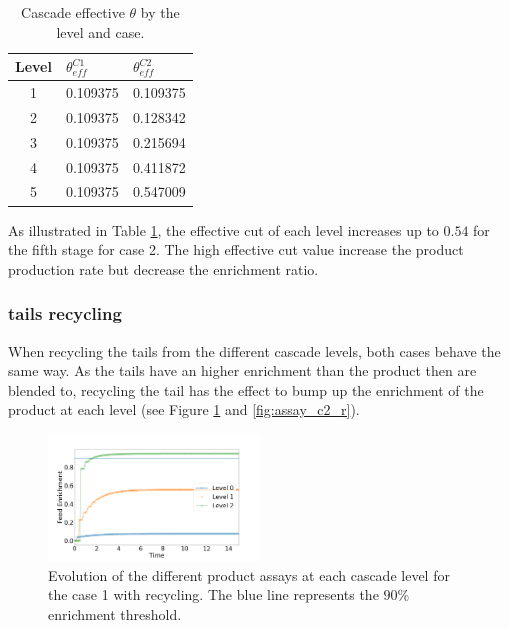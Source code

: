 \documentclass{anstrans}
\begin{document}
\begin{table}[htb]
\centering
\begin{tabular}{cll}
\toprule

Level   &  $\theta_{eff}^{C1}$   & $\theta_{eff}^{C2}$ \\
\midrule
1       & 0.109375               & 0.109375     \\
2       & 0.109375               & 0.128342     \\
3       & 0.109375               & 0.215694     \\
4       & 0.109375               & 0.411872     \\
5       & 0.109375               & 0.547009     \\

\bottomrule
\end{tabular}
  \caption{Cascade effective $\theta$ by the level and case.}
  \label{tab:cascade_theta}
\end{table}
As illustrated in Table \ref{tab:cascade_theta}, the effective cut
of each level increases up to $0.54$ for the fifth stage for case 2. The high
effective cut value increase the product production rate but decrease the
enrichment ratio.

\subsubsection{tails recycling}
When recycling the tails from the different cascade levels, both cases behave
the same way. As the tails have an higher enrichment than the product then are
blended to, recycling the tail has the effect to bump up the enrichment of the
product at each level (see Figure \ref{fig:assay_c1_r} and \ref{fig:assay_c2_r}).

\begin{figure}[ht] %
  \centering
  \includegraphics[width=0.5\textwidth]{assay_case_1_rec.png}
  \caption{Evolution of the different product assays at each cascade level for
  the case 1 with recycling. The blue line represents the $90\%$ enrichment
  threshold.}\label{fig:assay_c1_r}
\end{figure}
\end{document}
